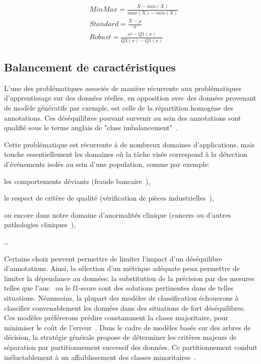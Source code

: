 \begin{equation} 
    \label{eq:scaling_methods}
    \begin{split}
    &MinMax=\frac{X-min(X)}{max(X)-min(X)}  \\
    &Standard=\frac{X-\mu{}}{\sigma}	    \\
    &Robust=\frac{xi- Q1(x)}{Q3(x)-Q1(x)}
    \end{split}
\end{equation}

\subsection{Balancement de caractéristiques}
L'une des problématiques associés de manière récurrente aux problématiques d'apprentissage sur des données réelles, en opposition avec des données provenant de modèle génératifs par exemple, est celle de la répartition homogène des annotations. Ces déséquilibres pouvant survenir au sein des annotations sont qualifié sous le terme anglais de "class imbalancement"~\cite{Prati2009, He2009}.\par

Cette problématique est récurrente à de nombreux domaines d'applications, mais touche essentiellement les domaines où la tâche visée correspond à la détection d'événements isolés au sein d'une population, comme par exemple: 
\begin{inlinerate}
    \item les comportements déviants (fraude bancaire~\cite{Phua2004}),
    \item le respect de critère de qualité (vérification de pièces industrielles~\cite{Wu2018}),
    \item ou encore dans notre domaine d'anormalités clinique (cancers ou d'autres pathologies cliniques~\cite{Celebi2007}),
    \item \ldots
\end{inlinerate}\par

Certains choix peuvent permettre de limiter l'impact d'un déséquilibre d'annotations. Ainsi, la sélection d'un métrique adéquate peux permettre de limiter la dépendance au données: la substitution de la précision par des mesures telles que l'\gls{auc}~\cite{Celebi2007} ou le f1-score sont des solutions pertinentes dans de telles situations. Néanmoins, la plupart des modèles de classification échouerons à classifier convenablement les données dans des situations de fort déséquilibres. Ces modèles préférerons prédire constamment la classe majoritaire, pour minimiser le coût de l'erreur~\cite{Huang2013}. Dans le cadre de modèles basés sur des arbres de décision, la stratégie générale propose de déterminer les critères majeurs de séparation par partitionnement successif des données. Ce partitionnement conduit inéluctablement à un affaiblissement des classes minoritaires~\cite{He2009}.\par 

